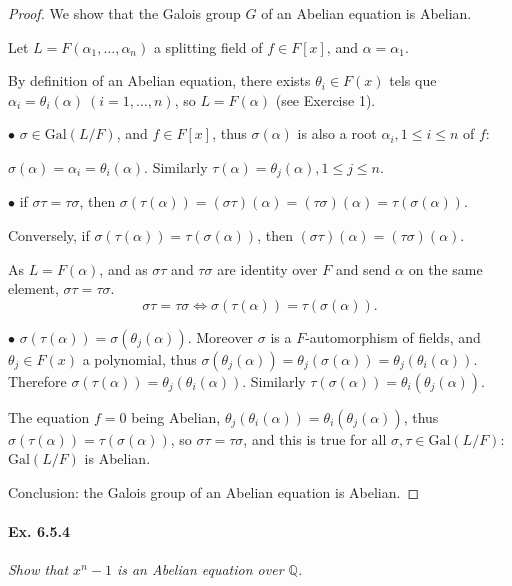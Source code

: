 \documentclass[11pt,a4paper]{article}
\newcommand{\Q}{\mathbb{Q}}
\newcommand{\Gal}{\mathrm{Gal}}
\begin{document}
\begin{proof}
We show that the Galois group $G$ of an Abelian equation is Abelian. 

Let $L=F(\alpha_1,\ldots,\alpha_n)$ a splitting field of $f \in F[x]$, and $\alpha=\alpha_1$.

By definition of an Abelian equation,  there exists $\theta_i \in F(x)$ tels que $\alpha_i = \theta_i(\alpha)\ (i=1,\ldots,n)$, so $L = F(\alpha)$ (see Exercise 1).

$\bullet$ 
$\sigma \in \Gal(L/F)$, and $f\in F[x]$, thus $\sigma(\alpha)$ is also a root $\alpha_i,1\leq i \leq n$ of $f$:

 $\sigma(\alpha) = \alpha_i = \theta_i(\alpha)$. Similarly $\tau(\alpha) = \theta_j(\alpha),1\leq j\leq n$.

$\bullet$ 
if $\sigma\tau = \tau \sigma$, then $\sigma( \tau (\alpha)) = (\sigma \tau)(\alpha) = (\tau \sigma)(\alpha) = \tau(\sigma(\alpha))$.

Conversely, if $\sigma( \tau (\alpha))  = \tau(\sigma(\alpha))$, then $(\sigma \tau)(\alpha) = (\tau \sigma)(\alpha)$.

As $L = F(\alpha)$, and as  $\sigma \tau$ and $\tau \sigma$ are identity over $F$ and send $\alpha$ on the same element, $\sigma\tau = \tau \sigma$.
$$\sigma \tau = \tau \sigma \iff \sigma( \tau (\alpha))  = \tau(\sigma(\alpha)).$$

$\bullet$ $\sigma(\tau(\alpha)) = \sigma(\theta_j(\alpha))$.
Moreover $\sigma$ is a $F$-automorphism of fields, and $\theta_j \in F(x)$ a polynomial, thus $\sigma(\theta_j(\alpha)) = \theta_j(\sigma(\alpha)) = \theta_j(\theta_i(\alpha))$. Therefore 
$\sigma(\tau(\alpha)) = \theta_j(\theta_i(\alpha))$. Similarly $\tau(\sigma(\alpha)) = \theta_i(\theta_j(\alpha))$.

The equation $f=0$ being Abelian, $\theta_j(\theta_i(\alpha)) = \theta_i(\theta_j(\alpha))$, thus $\sigma(\tau(\alpha)) = \tau(\sigma(\alpha))$, so $\sigma \tau=\tau \sigma$, and this is true for all  $\sigma,\tau \in \Gal(L/F)$: $\Gal(L/F)$ is Abelian.

Conclusion: the Galois group of an Abelian equation is Abelian. 
\end{proof}

\paragraph{Ex. 6.5.4}

{\it Show that $x^n-1$ is an Abelian equation over $\Q$.
}
\end{document}
